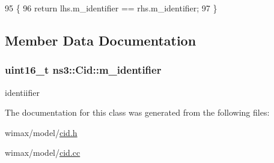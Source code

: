 \begin{DoxyCode}
95 \{
96   \textcolor{keywordflow}{return} lhs.m\_identifier == rhs.m\_identifier;
97 \}
\end{DoxyCode}


\subsection{Member Data Documentation}
\subsubsection[{\texorpdfstring{m\+\_\+identifier}{m_identifier}}]{\setlength{\rightskip}{0pt plus 5cm}uint16\+\_\+t ns3\+::\+Cid\+::m\+\_\+identifier\hspace{0.3cm}{\ttfamily [private]}}\hypertarget{classns3_1_1Cid_af9bfcfd6339671dc3ca1572f3b48dfd0}{}\label{classns3_1_1Cid_af9bfcfd6339671dc3ca1572f3b48dfd0}


identiifier 



The documentation for this class was generated from the following files\+:\begin{DoxyCompactItemize}
\item 
wimax/model/\hyperlink{cid_8h}{cid.\+h}\item 
wimax/model/\hyperlink{cid_8cc}{cid.\+cc}\end{DoxyCompactItemize}
